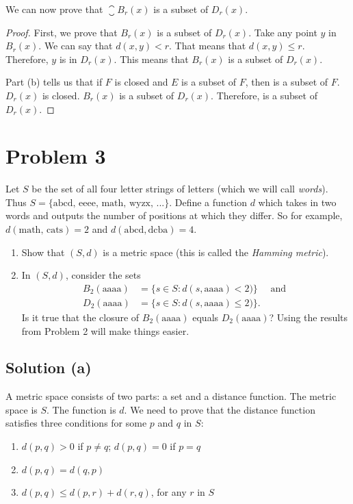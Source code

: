 \documentclass[11pt]{article}
\begin{document}
        We can now prove that $\closure{B_r(x)}$ is a subset of $D_r(x)$.
        \begin{proof}
            First, we prove that $B_r(x)$ is a subset of $D_r(x)$.
            Take any point $y$ in $B_r(x)$.
            We can say that $d(x,y) < r$.
            That means that $d(x,y) \leq r$.
            Therefore, $y$ is in $D_r(x)$.
            This means that $B_r(x)$ is a subset of $D_r(x)$.

            Part (b) tells us that if $F$ is closed and $E$ is a subset of $F$, then  is a subset of $F$.
            $D_r(x)$ is closed.
            $B_r(x)$ is a subset of $D_r(x)$.
            Therefore,  is a subset of $D_r(x)$.
        \end{proof}
    \pagebreak

\section{Problem 3}
    Let $S$ be the set of all four letter strings of letters (which we will call \textit{words}). Thus $S = \{\text{abcd, eeee, math, wyzx, ...}\}$. Define a function $d$ which takes in two words and outputs the number of positions at which they differ. So for example, $d(\text{math, cats}) = 2$ and $d(\text{abcd}, \text{dcba}) = 4$.

    \begin{enumerate}[label=(\alph*)]
        \item
        Show that $(S, d)$ is a metric space (this is called the \textit{Hamming metric}).

        \item 
        In $(S, d)$, consider the sets
        \begin{align*}
            B_2(\text{aaaa}) &= \{s \in S : d(s, \text{aaaa}) < 2)\} \quad \text{ and }\\[5pt] D_2(\text{aaaa}) &= \{s \in S : d(s, \text{aaaa}) \leq 2)\}.
        \end{align*}
        Is it true that the closure of $B_2(\text{aaaa})$ equals $D_2(\text{aaaa})$? Using the results from Problem 2 will make things easier.
        
    \end{enumerate}

    \subsection{Solution (a)}
        A metric space consists of two parts: a set and a distance function.
        The metric space is $S$.
        The function is $d$.
        We need to prove that the distance function satisfies three conditions for some $p$ and $q$ in $S$:
        \begin{enumerate}[label=(\alph*)]
            \item   $d(p,q) > 0$ if $p \neq q$; $d(p,q) = 0$ if $p = q$
            \item   $d(p,q) = d(q,p)$
            \item   $d(p,q) \leq d(p,r) + d(r,q)$, for any $r$ in $S$
        \end{enumerate}
\end{document}
